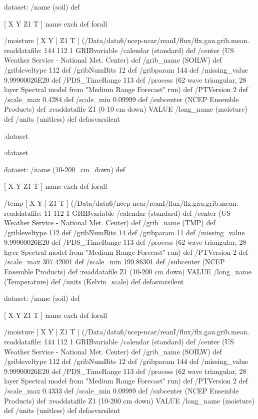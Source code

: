\begin{ingrid}
  dataset: /name (soil) def

   [ X Y Z1 T ] { name exch def } forall

   /moisture { [ X Y | Z1 T ] (/Data/data6/ncep-ncar/reanI/flux/flx.gau.grib.mean.%
   readdatafile:
   144 112 1 GRIBvariable
   /calendar (standard) def
   /center (US Weather Service - National Met. Center) def
   /grib_name (SOILW) def
   /gribleveltype 112 def
   /gribNumBits 12 def
   /gribparam 144 def
   /missing_value 9.99900026E20 def
   /PDS_TimeRange 113 def
   /process (62 wave triangular, 28 layer Spectral model from "Medium Range Forecast" run) def
   /PTVersion 2 def
   /scale_max 0.4284 def
   /scale_min 0.09999 def
   /subcenter (NCEP Ensemble Products) def
   :readdatafile
   Z1 (0-10 cm down) VALUE
   /long_name (moisture) def
   /units (unitless) def
   } defasvarsilent

  :dataset

 :dataset

 dataset: /name (10-200_cm_down) def

  [ X Y Z1 T ] { name exch def } forall

  /temp { [ X Y | Z1 T ] (/Data/data6/ncep-ncar/reanI/flux/flx.gau.grib.mean.%
  readdatafile:
  11 112 1 GRIBvariable
  /calendar (standard) def
  /center (US Weather Service - National Met. Center) def
  /grib_name (TMP) def
  /gribleveltype 112 def
  /gribNumBits 14 def
  /gribparam 11 def
  /missing_value 9.99900026E20 def
  /PDS_TimeRange 113 def
  /process (62 wave triangular, 28 layer Spectral model from "Medium Range Forecast" run) def
  /PTVersion 2 def
  /scale_max 307.42001 def
  /scale_min 199.86301 def
  /subcenter (NCEP Ensemble Products) def
  :readdatafile
  Z1 (10-200 cm down) VALUE
  /long_name (Temperature) def
  /units (Kelvin_scale) def
  } defasvarsilent 

  dataset: /name (soil) def

   [ X Y Z1 T ] { name exch def } forall

   /moisture { [ X Y | Z1 T ] (/Data/data6/ncep-ncar/reanI/flux/flx.gau.grib.mean.%
   readdatafile:
   144 112 1 GRIBvariable
   /calendar (standard) def
   /center (US Weather Service - National Met. Center) def
   /grib_name (SOILW) def
   /gribleveltype 112 def
   /gribNumBits 12 def
   /gribparam 144 def
   /missing_value 9.99900026E20 def
   /PDS_TimeRange 113 def
   /process (62 wave triangular, 28 layer Spectral model from "Medium Range Forecast" run) def
   /PTVersion 2 def
   /scale_max 0.4333 def
   /scale_min 0.09999 def
   /subcenter (NCEP Ensemble Products) def
   :readdatafile
   Z1 (10-200 cm down) VALUE
   /long_name (moisture) def
   /units (unitless) def
   } defasvarsilent


\end{ingrid}
